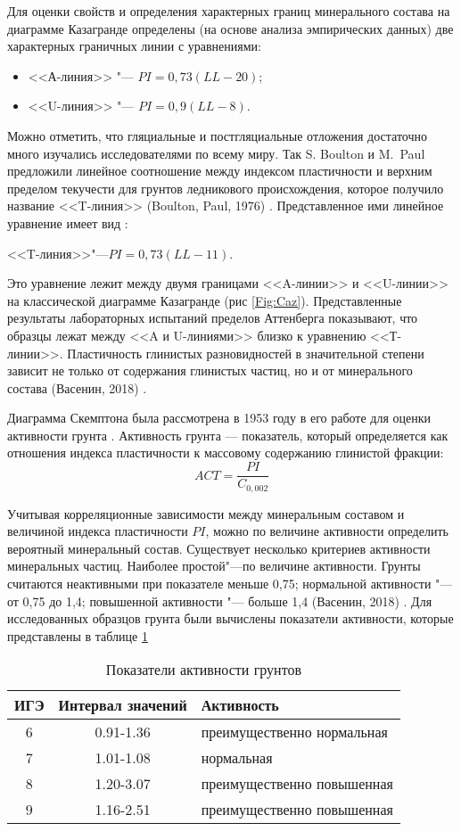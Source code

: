 Для оценки свойств и определения характерных границ минерального состава на диаграмме Казагранде определены (на основе анализа эмпирических данных) две характерных граничных линии с уравнениями:

\begin{itemize}
    \item <<А-линия>> "--- $PI = 0,73(LL - 20)$;
    \item <<U-линия>> "--- $PI = 0,9(LL - 8)$.
\end{itemize}

Можно отметить, что гляциальные и постгляциальные отложения достаточно много изучались исследователями по всему миру. Так S. Boulton и M.~Paul  предложили линейное соотношение между  индексом пластичности и верхним пределом текучести  для грунтов ледникового происхождения, которое получило название <<T-линия>> (Boulton, Paul, 1976) \cite{boulton1976}. Представленное ими линейное уравнение имеет вид :

<<T-линия>>"---$PI = 0,73(LL-11)$.

Это уравнение лежит между двумя границами <<A-линии>> и <<U-линии>> на классической диаграмме Казагранде (рис \ref{Fig:Caz}). Представленные результаты лабораторных испытаний пределов Аттенберга показывают, что образцы лежат между <<A и U-линиями>> близко к уравнению <<Т-линии>>. Пластичность глинистых разновидностей в значительной степени зависит не только от содержания глинистых частиц, но и от минерального состава (Васенин, 2018) \cite{vasenin2018}.

Диаграмма Скемптона была рассмотрена в 1953 году в его работе для оценки активности грунта \cite{skempton1953}.
Активность грунта — показатель, который определяется как отношения индекса пластичности к массовому содержанию глинистой фракции:
$$ ACT = \frac{PI}{C_{0,002}}$$

Учитывая корреляционные зависимости между минеральным составом и величиной индекса пластичности $PI$, можно по величине активности определить вероятный минеральный состав. Существует несколько критериев активности минеральных частиц. Наиболее простой"---по величине активности. 
Грунты считаются неактивными при показателе меньше 0,75; нормальной активности "--- от 0,75 до 1,4; повышенной активности "--- больше 1,4 (Васенин, 2018) \cite{vasenin2018}.
Для исследованных образцов грунта были вычислены показатели активности, которые представлены в таблице \ref{tab:ak}

\begin{table}[]
    \centering
    \caption{Показатели активности грунтов} \label{tab:ak}
    \begin{tabular}{@{}ccl@{}}
    \toprule
    ИГЭ & Интервал значений & Активность\\ \midrule
    6	& 0.91-1.36	&  преимущественно нормальная  \\
    7	& 1.01-1.08	&  нормальная  \\
    8	& 1.20-3.07	&  преимущественно повышенная 	 \\
    9	& 1.16-2.51	& преимущественно повышенная\\ \bottomrule
    \end{tabular}
    \\ 
\end{table}
    

